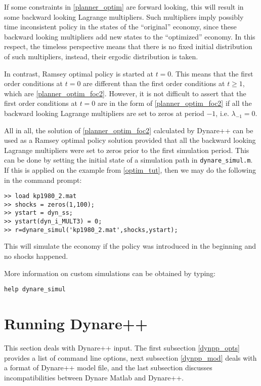 \documentclass[10pt]{article}
\begin{document}
If some constraints in \eqref{planner_optim} are forward looking, this
will result in some backward looking Lagrange multipliers. Such
multipliers imply possibly time inconsistent policy in the states of
the ``original'' economy, since these backward looking multipliers add
new states to the ``optimized'' economy. In this respect, the timeless
perspective means that there is no fixed initial distribution of such
multipliers, instead, their ergodic distribution is taken.

In contrast, Ramsey optimal policy is started at $t=0$. This means
that the first order conditions at $t=0$ are different than the first
order conditions at $t\geq 1$, which are
\eqref{planner_optim_foc2}. However, it is not difficult to assert
that the first order conditions at $t=0$ are in the form of
\eqref{planner_optim_foc2} if all the backward looking Lagrange
multipliers are set to zeros at period $-1$, i.e. $\lambda_{-1}=0$.

All in all, the solution of \eqref{planner_optim_foc2} calculated by
Dynare++ can be used as a Ramsey optimal policy solution provided that
all the backward looking Lagrange multipliers were set to zeros prior
to the first simulation period. This can be done by setting the
initial state of a simulation path in {\tt dynare\_simul.m}. If this
is applied on the example from \ref{optim_tut}, then we may do the
following in the command prompt:
{\small
\begin{verbatim}
>> load kp1980_2.mat
>> shocks = zeros(1,100);
>> ystart = dyn_ss;
>> ystart(dyn_i_MULT3) = 0;
>> r=dynare_simul('kp1980_2.mat',shocks,ystart);
\end{verbatim}
}
This will simulate the economy if the policy was introduced in the
beginning and no shocks happened.

More information on custom simulations can be obtained by typing:
{\small
\begin{verbatim}
help dynare_simul
\end{verbatim}
}


\section{Running Dynare++}

This section deals with Dynare++ input. The first subsection
\ref{dynpp_opts} provides a list of command line options, next
subsection \ref{dynpp_mod} deals with a format of Dynare++ model file,
and the last subsection discusses incompatibilities between Dynare
Matlab and Dynare++.
\end{document}
